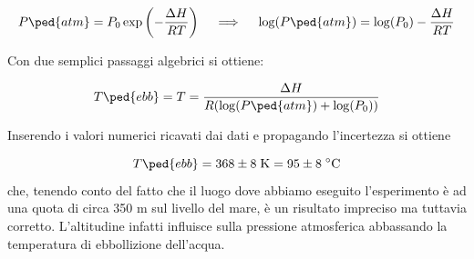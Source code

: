 \begin{equation}
    P\ped{atm} =  P_0 \exp \left( - \frac{\Delta H}{RT} \right) 
        \quad \implies \quad
    \log (P\ped{atm}) = \log (P_0) - \frac{\Delta H}{RT}
\end{equation}

Con due semplici passaggi algebrici si ottiene:

\begin{equation}
    T\ped{ebb} = T = \frac{\Delta H}{R(\log (P\ped{atm}) + \log (P_0))}
\end{equation}

Inserendo i valori numerici ricavati dai dati e propagando l'incertezza si ottiene

\begin{equation}
    T\ped{ebb} = 368 \pm 8 \; \si{\kelvin} = 95 \pm 8 \; \si{\celsius}
\end{equation}
%
che, tenendo conto del fatto che il luogo dove abbiamo eseguito l'esperimento è ad una quota di circa 350 m
sul livello del mare, è un risultato impreciso ma tuttavia corretto. L'altitudine infatti influisce sulla pressione atmosferica
abbassando la temperatura di ebbollizione dell'acqua.
